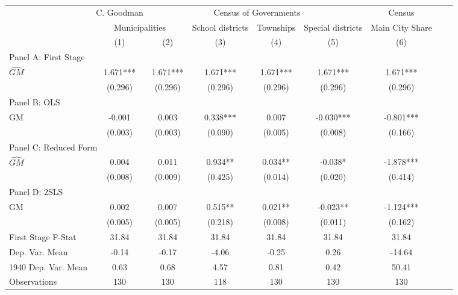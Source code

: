 \begin{tabular}{l*{8}{c}} \toprule
&\multicolumn{1}{c}{C. Goodman}&\multicolumn{4}{c}{Census of Governments}&\multicolumn{1}{c}{Census}\\\cmidrule(lr){2-2}\cmidrule(lr){3-6}\cmidrule(lr){7-7}
&\multicolumn{2}{c}{Municipalities}&\multicolumn{1}{c}{School districts}&\multicolumn{1}{c}{Townships}&\multicolumn{1}{c}{Special districts}&\multicolumn{1}{c}{Main City Share}\\\cmidrule(lr){2-3}\cmidrule(lr){4-6}\cmidrule(lr){7-7}
&\multicolumn{1}{c}{(1)}&\multicolumn{1}{c}{(2)}&\multicolumn{1}{c}{(3)}&\multicolumn{1}{c}{(4)}&\multicolumn{1}{c}{(5)}&\multicolumn{1}{c}{(6)}\\
\cmidrule(lr){1-7}
\multicolumn{6}{l}{Panel A: First Stage}\\
\cmidrule(lr){1-7}
$\widehat{GM}$  &    1.671***&    1.671***&    1.671***&    1.671***&    1.671***&    1.671***\\
                &  (0.296)   &  (0.296)   &  (0.296)   &  (0.296)   &  (0.296)   &  (0.296)   \\
\cmidrule(lr){1-7}
\multicolumn{6}{l}{Panel B: OLS}\\
\cmidrule(lr){1-7}
GM              &   -0.001   &    0.003   &    0.338***&    0.007   &   -0.030***&   -0.801***\\
                &  (0.003)   &  (0.003)   &  (0.090)   &  (0.005)   &  (0.008)   &  (0.166)   \\
\cmidrule(lr){1-7}
\multicolumn{6}{l}{Panel C: Reduced Form}\\
\cmidrule(lr){1-7}
$\widehat{GM}$  &    0.004   &    0.011   &    0.934** &    0.034** &   -0.038*  &   -1.878***\\
                &  (0.008)   &  (0.009)   &  (0.425)   &  (0.014)   &  (0.020)   &  (0.414)   \\
\cmidrule(lr){1-7}
\multicolumn{6}{l}{Panel D: 2SLS}\\
\cmidrule(lr){1-7}
GM              &    0.002   &    0.007   &    0.515** &    0.021** &   -0.023** &   -1.124***\\
                &  (0.005)   &  (0.005)   &  (0.218)   &  (0.008)   &  (0.011)   &  (0.162)   \\
\midrule
First Stage F-Stat&    31.84   &    31.84   &    31.84   &    31.84   &    31.84   &    31.84   \\
Dep. Var. Mean  &    -0.14   &    -0.17   &    -4.06   &    -0.25   &     0.26   &   -14.64   \\
1940 Dep. Var. Mean&     0.63   &     0.68   &     4.57   &     0.81   &     0.42   &    50.41   \\
Observations    &      130   &      130   &      118   &      130   &      130   &      130   \\
       \bottomrule \end{tabular}
